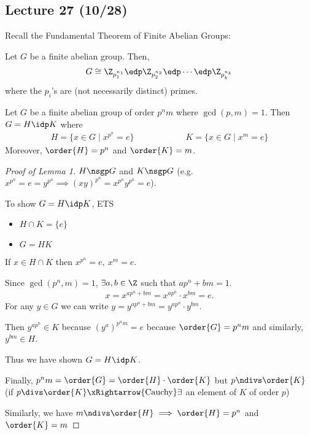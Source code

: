 \subsection*{Lecture 27 (10/28)} %
Recall the Fundamental Theorem of Finite Abelian Groups:
 \begin{theorem} Let \(G\) be a finite abelian group. Then,
     \begin{align*}
         G\cong \Z_{p_1^{n_1}}\edp \Z_{p_2^{n_2}}\edp\cdots\edp \Z_{p_k^{n_k}}
     \end{align*}
     where the \(p_i\)'s are (not necessarily distinct) primes.
 \end{theorem}

 \begin{lemma}
 Let \(G\) be a finite abelian group of order \(p^n m\) where \(\gcd(p,m)=1\). Then \(G = H\idp K\) where \begin{align*}
     H=\{x\in G\mid x^{p^n}=e\} \qquad\qquad\qquad K = \{x\in G \mid x^m = e\}
 \end{align*}
 Moreover, \(\order{H} = p^n\) and \(\order{K} = m\).
 \end{lemma}
 \begin{proof}[Proof of Lemma 1]
     \(H\nsgp G\) and \(K\nsgp G\) (e.g. \(x^{p^n}=e=y^{p^n}\implies (xy)^{p^n}=x^{p^n}y^{p^n}=e\)).

     To show \(G = H \idp K\), ETS \begin{itemize}
         \item \(H\cap K = \{e\}\)
         \item \(G = HK\)
     \end{itemize}

     If \(x\in H\cap K\) then \(x^{p^n} = e, \  x^m = e\).

     Since \(\gcd(p^n, m) = 1\), \(\exists a,b\in\Z\) such that \(ap^n+bm = 1\).
     \begin{align*}
         x = x^{ap^n+bm} = x^{ap^n}\cdot x^{bm} = e.
     \end{align*}
     For any \(y\in G\) we can write \(y = y^{ap^n+bm} = y^{ap^n}\cdot y^{bm}\).

     Then \(y^{ap^n}\in K\) because \((y^a)^{p^n m} = e\) because \(\order{G} = p^n m\) and similarly, \(y^{bm}\in H\).

     Thus we have shown \(G=H\idp K\).

     Finally, \(p^nm = \order{G} = \order{H}\cdot\order{K}\) but \(p\ndivs \order{K}\) (if \(p\divs \order{K} \xRightarrow{\text{Cauchy}} \exists\) an element of \(K\) of order \(p\))

     Similarly, we have \(m\ndivs \order{H} \implies \order{H}=p^n\) and \(\order{K} = m\)
 \end{proof}

